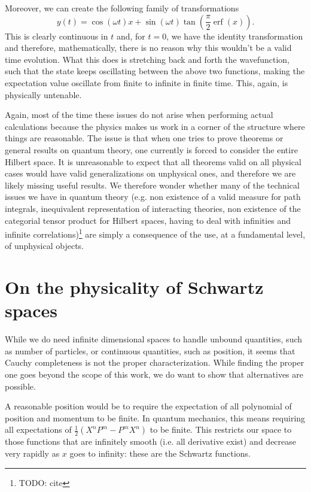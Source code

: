 \documentclass[10pt,twocolumn, nofootinbib]{revtex4-2}
\DeclareMathOperator{\erf}{erf}
\begin{document}
Moreover, we can create the following family of transformations
\begin{equation}
	y(t) = \cos(\omega t) x + \sin(\omega t) \tan \left(\frac{\pi}{2}\erf(x)\right).
\end{equation}
This is clearly continuous in $t$ and, for $t=0$, we have the identity transformation and therefore, mathematically, there is no reason why this wouldn't be a valid time evolution. What this does is stretching back and forth the wavefunction, such that the state keeps oscillating between the above two functions, making the expectation value oscillate from finite to infinite in finite time. This, again, is physically untenable.

Again, most of the time these issues do not arise when performing actual calculations because the physics makes us work in a corner of the structure where things are reasonable. The issue is that when one tries to prove theorems or general results on quantum theory, one currently is forced to consider the entire Hilbert space. It is unreasonable to expect that all theorems valid on all physical cases would have valid generalizations on unphysical ones, and therefore we are likely missing useful results. We therefore wonder whether many of the technical issues we have in quantum theory (e.g. non existence of a valid measure for path integrals, inequivalent representation of interacting theories, non existence of the categorial tensor product for Hilbert spaces, having to deal with infinities and infinite correlations)\footnote{TODO: cite} are simply a consequence of the use, at a fundamental level, of unphysical objects.

\section{On the physicality of Schwartz spaces}

While we do need infinite dimensional spaces to handle unbound quantities, such as number of particles, or continuous quantities, such as position, it seems that Cauchy completeness is not the proper characterization. While finding the proper one goes beyond the scope of this work, we do want to show that alternatives are possible.

A reasonable position would be to require the expectation of all polynomial of position and momentum to be finite. In quantum mechanics, this means requiring all expectations of $\frac{1}{2}(X^nP^m - P^mX^n)$ to be finite. This restricts our space to those functions that are infinitely smooth (i.e. all derivative exist) and decrease very rapidly as $x$ goes to infinity: these are the Schwartz functions.
\end{document}
